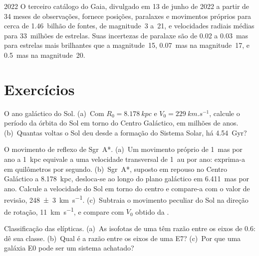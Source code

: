 \begin{dated}{2022}
O terceiro catálogo do Gaia, divulgado em 13 de junho de 2022 a partir de 34
meses de observações, fornece posições, paralaxes e movimentos próprios para
cerca de 1.46~bilhão de fontes, de magnitude~3 a~21, e velocidades radiais
médias para 33~milhões de estrelas. Suas incertezas de paralaxe são de 0.02 a
\qty{0.03}{mas} para estrelas mais brilhantes que a magnitude~15, \qty{0.07}{mas} na
magnitude~17, e \qty{0.5}{mas} na magnitude~20.
\end{dated}

\section{Exercícios}

\begin{exercise}[$\star$]\label{exo:b3:milky-way-galaxies:1}
O ano galáctico do Sol. (a)~Com $R_0 = \qty{8.178}{kpc}$ e
$V_0 = \qty{229}{km.s^{-1}}$, calcule o período da órbita do Sol em torno do
Centro Galáctico, em milhões de anos. (b)~Quantas voltas o Sol deu desde a
formação do Sistema Solar, há \qty{4.54}{Gyr}?
\end{exercise}

\begin{exercise}[$\star$]\label{exo:b3:milky-way-galaxies:2}
O movimento de reflexo de Sgr~A*. (a)~Um movimento próprio de \qty{1}{mas}
por ano a \qty{1}{kpc} equivale a uma velocidade transversal de \qty{1}{au} por ano:
exprima-a em quilômetros por segundo. (b)~Sgr~A*, suposto em repouso no Centro
Galáctico a \qty{8.178}{kpc}, desloca-se ao longo do plano galáctico em \qty{6.411}{mas}
por ano. Calcule a velocidade do Sol em torno do centro e compare-a com o valor de
revisão, \qty[separate-uncertainty=true]{248 \pm 3}{km.s^{-1}}. (c)~Subtraia o movimento
peculiar do Sol na direção de rotação, \qty{11}{km.s^{-1}}, e
compare com $V_0$ obtido da .
\end{exercise}

\begin{exercise}[$\star$]\label{exo:b3:milky-way-galaxies:3}
Classificação das elípticas. (a)~As isofotas de uma  têm
razão entre os eixos de 0.6: dê sua classe. (b)~Qual é a razão entre os eixos de uma E7?
(c)~Por que uma galáxia E0 pode ser um sistema achatado?
\end{exercise}

